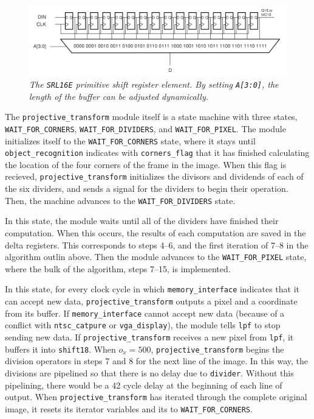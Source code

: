 \documentclass[10pt]{article}
\begin{document}
\begin{figure}[h!]
\centering
\includegraphics[width=\textwidth]{images/srl16.png}
\caption{\emph{The {\tt SRL16E} primitive shift register element. By setting {\tt A[3:0]}, the length of the buffer can be adjusted dynamically.}}
\end{figure}

The {\tt projective\_transform} module itself is a state machine with three states, {\tt WAIT\_FOR\_CORNERS}, {\tt WAIT\_FOR\_DIVIDERS}, and {\tt WAIT\_FOR\_PIXEL}. The module initializes itself to the {\tt WAIT\_FOR\_CORNERS} state, where it stays until {\tt object\_recognition} indicates with {\tt corners\_flag} that it has finished calculating the location of the four corners of the frame in the image. When this flag is recieved, {\tt projective\_transform} initializes the divisors and dividends of each of the six dividers, and sends a signal for the dividers to begin their operation. Then, the machine advances to the {\tt WAIT\_FOR\_DIVIDERS} state.

In this state, the module waits until all of the dividers have finished their computation. When this occurs, the results of each computation are saved in the delta registers. This corresponds to steps 4--6, and the first iteration of 7--8 in the algorithm outlin above. Then the module advances to the {\tt WAIT\_FOR\_PIXEL} state, where the bulk of the algorithm, steps 7--15, is implemented.

In this state, for every clock cycle in which {\tt memory\_interface} indicates that it can accept new data, {\tt projective\_transform} outputs a pixel and a coordinate from its buffer. If {\tt memory\_interface} cannot accept new data (because of a conflict with {\tt ntsc\_catpure} or {\tt vga\_display}), the module tells {\tt lpf} to stop sending new data. If {\tt projective\_transform} receives a new pixel from {\tt lpf}, it buffers it into {\tt shift18}. When $o_x = 500$, {\tt projective\_transform} begins the division operators in steps 7 and 8 for the next line of the image. In this way, the divisions are pipelined so that there is no delay due to {\tt divider}. Without this pipelining, there would be a 42 cycle delay at the beginning of each line of output. When {\tt projective\_transform} has iterated through the complete original image, it resets its iterator variables and its to {\tt WAIT\_FOR\_CORNERS}.
\end{document}
